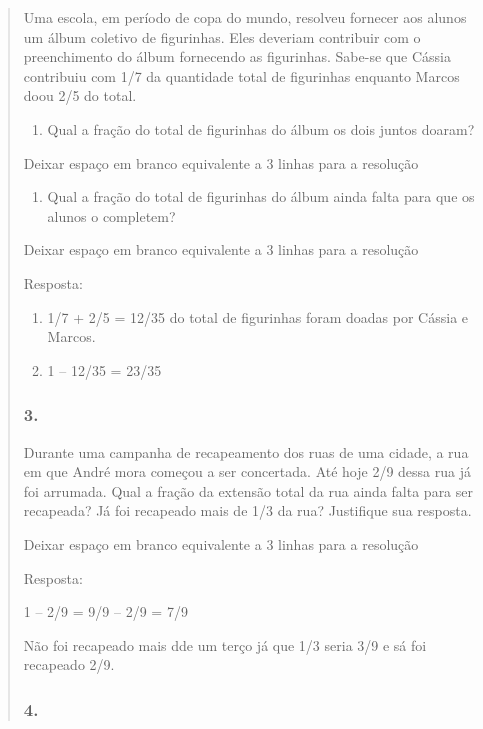 \begin{enumerate}
\begin{escolha}
\begin{enumerate}
\begin{itemize}
\begin{itemize}
\begin{escolha}
\begin{quote}
\begin{escolha}
{Uma escola, em período de copa do mundo, resolveu fornecer aos alunos um
álbum coletivo de figurinhas. Eles deveriam contribuir com o
preenchimento do álbum fornecendo as figurinhas. Sabe-se que Cássia
contribuiu com 1/7 da quantidade total de figurinhas enquanto Marcos
doou 2/5 do total.

\begin{enumerate}
\def\labelenumi{\alph{enumi})}
\item
  Qual a fração do total de figurinhas do álbum os dois juntos doaram?
\end{enumerate}

Deixar espaço em branco equivalente a 3 linhas para a resolução

\begin{enumerate}
\def\labelenumi{\alph{enumi})}
\item
  Qual a fração do total de figurinhas do álbum ainda falta para que os
  alunos o completem?
\end{enumerate}

Deixar espaço em branco equivalente a 3 linhas para a resolução

Resposta:

\begin{enumerate}
\def\labelenumi{\alph{enumi})}
\item
  1/7 + 2/5 = 12/35 do total de figurinhas foram doadas por Cássia e
  Marcos.
\item
  1 -- 12/35 = 23/35
\end{enumerate}

\subsubsection{3.}\label{section-106}

Durante uma campanha de recapeamento dos ruas de uma cidade, a rua em
que André mora começou a ser concertada. Até hoje 2/9 dessa rua já foi
arrumada. Qual a fração da extensão total da rua ainda falta para ser
recapeada? Já foi recapeado mais de 1/3 da rua? Justifique sua resposta.

Deixar espaço em branco equivalente a 3 linhas para a resolução

Resposta:

1 -- 2/9 = 9/9 -- 2/9 = 7/9

Não foi recapeado mais dde um terço já que 1/3 seria 3/9 e sá foi
recapeado 2/9.

\subsubsection{4. }\label{section-107}

}
\end{escolha}
\end{quote}
\end{escolha}
\end{itemize}
\end{itemize}
\end{enumerate}
\end{escolha}
\end{enumerate}
